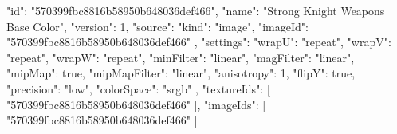 {
  "id": "570399fbc8816b58950b648036def466",
  "name": "Strong Knight Weapons Base Color",
  "version": 1,
  "source": {
    "kind": "image",
    "imageId": "570399fbc8816b58950b648036def466"
  },
  "settings": {
    "wrapU": "repeat",
    "wrapV": "repeat",
    "wrapW": "repeat",
    "minFilter": "linear",
    "magFilter": "linear",
    "mipMap": true,
    "mipMapFilter": "linear",
    "anisotropy": 1,
    "flipY": true,
    "precision": "low",
    "colorSpace": "srgb"
  },
  "textureIds": [
    "570399fbc8816b58950b648036def466"
  ],
  "imageIds": [
    "570399fbc8816b58950b648036def466"
  ]
}
